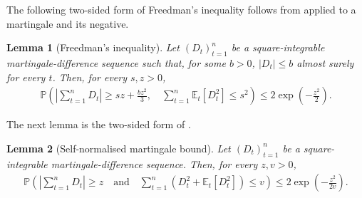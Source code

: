\documentclass[11pt]{article}
\newtheorem{lemma}[lemma]{Lemma}
\newcommand{\E}{\mathbb E}
\newcommand{\Pp}{\mathbb P}
\newcommand{\1}{\mathbf 1}
\begin{document}
The following two-sided form of Freedman's inequality follows from
\citet[Theorem~3.10]{bercu2015concentration} applied to a martingale and its
negative.
\begin{lemma}[Freedman's inequality]
    \label{lem:freedman}
    Let $(D_t)_{t=1}^n$ be a square-integrable
    martingale-difference sequence such that, for some $b>0$,
    $|D_t|\leq b$ almost surely for every $t$. Then, for every $s,z>0$,
    \begin{align}
        \Pp\left(
        \left|\sum_{t=1}^n D_t\right|
        \geq sz+\frac{bz^2}{3},
        \quad
        \sum_{t=1}^n\E_t[D_t^2]\leq s^2
        \right)
        \leq
        2\exp\left(-\frac{z^2}{2}\right).
    \end{align}
\end{lemma}

The next lemma is the two-sided form of
\citet[Theorem~3.26]{bercu2015concentration}.
\begin{lemma}[Self-normalised martingale bound]
    \label{lem:self-normalised-martingale}
    Let $(D_t)_{t=1}^n$ be a square-integrable
    martingale-difference sequence. Then, for every $z,v>0$,
    \begin{align}
        \Pp\left(
        \left|\sum_{t=1}^n D_t\right|\geq z\quad\text{and}\quad
        \sum_{t=1}^n \left(D_t^2+\E_t[D_t^2]\right)\leq v
        \right)
        \leq
        2\exp\left(-\frac{z^2}{2v}\right).
        \label{eq:self-normalised-martingale}
    \end{align}
\end{lemma}
\end{document}
